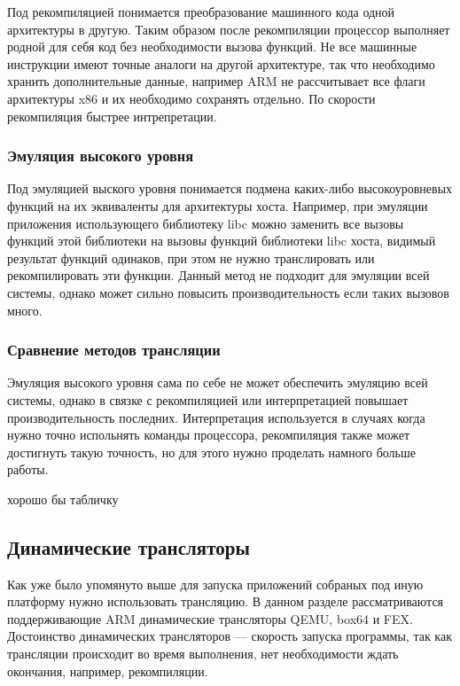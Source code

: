 Под рекомпиляцией понимается преобразование машинного кода одной архитектуры в другую. Таким образом после рекомпиляции процессор выполняет родной для себя код без необходимости вызова функций. Не все машинные инструкции имеют точные аналоги на другой архитектуре, так что необходимо хранить дополнительные данные, например ARM не рассчитывает все флаги архитектуры x86 и их необходимо сохранять отдельно. По скорости рекомпиляция быстрее интрепретации.

\subsubsection{Эмуляция высокого уровня}

Под эмуляцией выского уровня понимается подмена каких-либо высокоуровневых функций на их эквиваленты для архитектуры хоста. Например, при эмуляции приложения использующего библиотеку libc можно заменить все вызовы функций этой библиотеки на вызовы функций библиотеки libc хоста, видимый результат функций одинаков, при этом не нужно транслировать или рекомпилировать эти функции. Данный метод не подходит для эмуляции всей системы, однако может сильно повысить производительность если таких вызовов много.

\subsubsection{Сравнение методов трансляции}

Эмуляция высокого уровня сама по себе не может обеспечить эмуляцию всей системы, однако в связке с рекомпиляцией или интерпретацией повышает производительность последних. Интерпретация используется в случаях когда нужно точно испольнять команды процессора, рекомпиляция также может достигнуть такую точность, но для этого нужно проделать намного больше работы.

хорошо бы табличку

\subsection{Динамические трансляторы}

Как уже было упомянуто выше для запуска приложений собраных под иную платформу нужно использовать трансляцию. В данном разделе рассматриваются поддерживающие ARM динамические трансляторы QEMU, box64 и FEX. Достоинство динамических трансляторов --- скорость запуска программы, так как трансляции происходит во время выполнения, нет необходимости ждать окончания, например, рекомпиляции.

